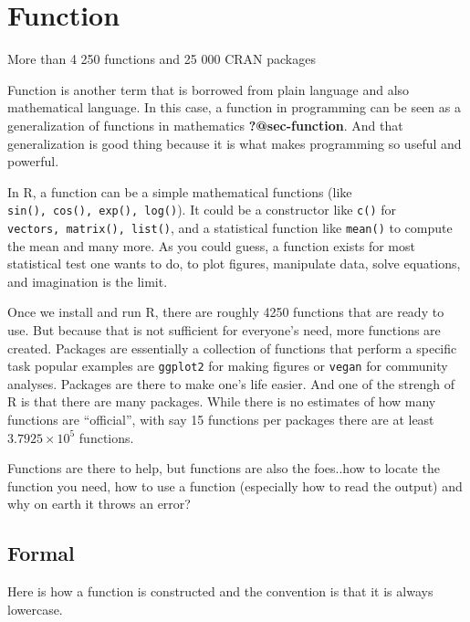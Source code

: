 \documentclass[
  letterpaper,
  DIV=11,
  numbers=noendperiod]{scrreprt}
\begin{document}

\chapter{Function}\label{sec-functionCoding}

More than 4 250 functions and 25 000 CRAN packages

Function is another term that is borrowed from plain language and also
mathematical language. In this case, a function in programming can be
seen as a generalization of functions in mathematics
\textbf{?@sec-function}. And that generalization is good thing because
it is what makes programming so useful and powerful.

In R, a function can be a simple mathematical functions (like
\texttt{sin(),\ cos(),\ exp(),\ log()}). It could be a constructor like
\texttt{c()} for \texttt{vectors,\ matrix(),\ list()}, and a statistical
function like \texttt{mean()} to compute the mean and many more. As you
could guess, a function exists for most statistical test one wants to
do, to plot figures, manipulate data, solve equations, and imagination
is the limit.

Once we install and run R, there are roughly 4250 functions that are
ready to use. But because that is not sufficient for everyone's need,
more functions are created. Packages are essentially a collection of
functions that perform a specific task popular examples are
\texttt{ggplot2} for making figures or \texttt{vegan} for community
analyses. Packages are there to make one's life easier. And one of the
strengh of R is that there are many packages. While there is no
estimates of how many functions are ``official'', with say 15 functions
per packages there are at least \ensuremath{3.7925\times 10^{5}}
functions.

Functions are there to help, but functions are also the foes..how to
locate the function you need, how to use a function (especially how to
read the output) and why on earth it throws an error?

\section*{Formal}\label{formal-39}


Here is how a function is constructed and the convention is that it is
always lowercase.
\end{document}
